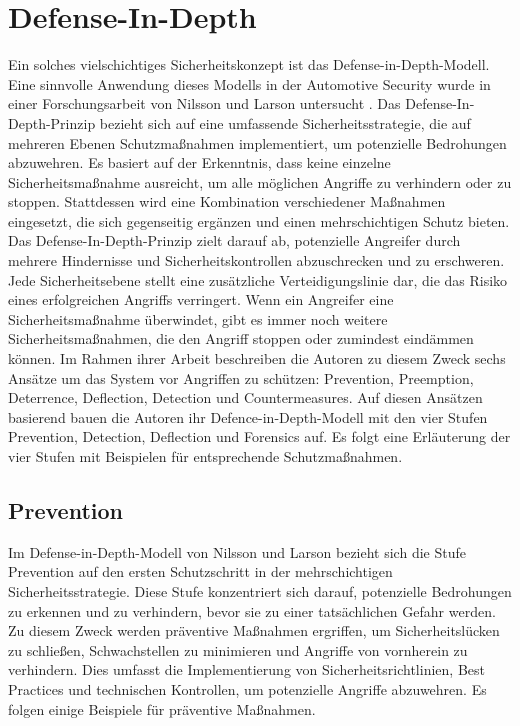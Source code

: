\section{Defense-In-Depth}
Ein solches vielschichtiges Sicherheitskonzept ist das Defense-in-Depth-Modell. Eine sinnvolle Anwendung dieses Modells in der Automotive Security wurde in einer Forschungsarbeit von Nilsson und Larson untersucht \cite{Nilsson.2009}. 
Das Defense-In-Depth-Prinzip bezieht sich auf eine umfassende Sicherheitsstrategie, die auf mehreren Ebenen Schutzmaßnahmen implementiert, um potenzielle Bedrohungen abzuwehren. Es basiert auf der Erkenntnis, dass keine einzelne Sicherheitsmaßnahme ausreicht, um alle möglichen Angriffe zu verhindern oder zu stoppen. Stattdessen wird eine Kombination verschiedener Maßnahmen eingesetzt, die sich gegenseitig ergänzen und einen mehrschichtigen Schutz bieten.
Das Defense-In-Depth-Prinzip zielt darauf ab, potenzielle Angreifer durch mehrere Hindernisse und Sicherheitskontrollen abzuschrecken und zu erschweren. Jede Sicherheitsebene stellt eine zusätzliche Verteidigungslinie dar, die das Risiko eines erfolgreichen Angriffs verringert. Wenn ein Angreifer eine Sicherheitsmaßnahme überwindet, gibt es immer noch weitere Sicherheitsmaßnahmen, die den Angriff stoppen oder zumindest eindämmen können.
Im Rahmen ihrer Arbeit beschreiben die Autoren zu diesem Zweck sechs Ansätze um das System vor Angriffen zu schützen: Prevention, Preemption, Deterrence, Deflection, Detection und Countermeasures. Auf diesen Ansätzen basierend bauen die Autoren ihr Defence-in-Depth-Modell mit den vier Stufen Prevention, Detection, Deflection und Forensics auf. Es folgt eine Erläuterung der vier Stufen mit Beispielen für entsprechende Schutzmaßnahmen.

\subsection{Prevention}
Im Defense-in-Depth-Modell von Nilsson und Larson bezieht sich die Stufe Prevention auf den ersten Schutzschritt in der mehrschichtigen Sicherheitsstrategie. Diese Stufe konzentriert sich darauf, potenzielle Bedrohungen zu erkennen und zu verhindern, bevor sie zu einer tatsächlichen Gefahr werden.
Zu diesem Zweck werden präventive Maßnahmen ergriffen, um Sicherheitslücken zu schließen, Schwachstellen zu minimieren und Angriffe von vornherein zu verhindern. Dies umfasst die Implementierung von Sicherheitsrichtlinien, Best Practices und technischen Kontrollen, um potenzielle Angriffe abzuwehren. Es  folgen einige Beispiele für präventive Maßnahmen.

